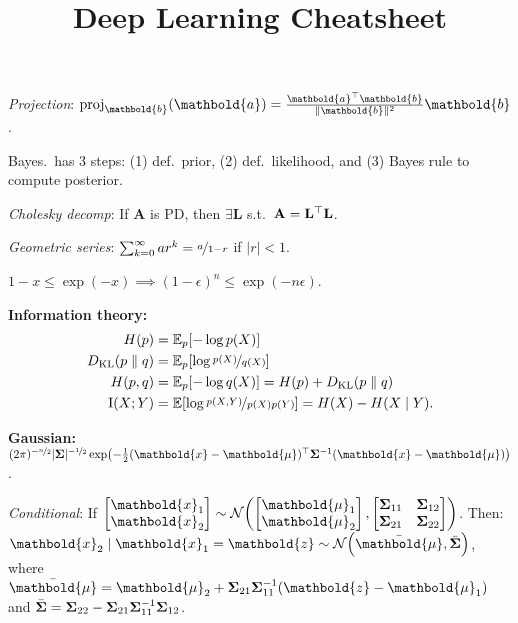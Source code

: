 \documentclass[9pt]{extarticle}
\title{Deep Learning Cheatsheet}
\newenvironment{subtopic}[1]
{\textbf{\sffamily #1:}}
{}
\renewcommand{\det}[1]{|#1|}
\renewcommand{\mat}[1]{\ensuremath{\mathbf{#1}}}
\renewcommand{\vec}[1]{\ensuremath{\mathbold{#1}}}
\begin{document}
\setlength{\columnsep}{0.1cm}

\begin{multicols*}{3}

    \textit{Projection}: $\mathrm{proj}_{\vec{b}} (\vec{a}) = \frac{\transpose{\vec{a}} \vec{b}}{\| \vec{b}
            \|^2} \vec{b}$.

    Bayes.\ has 3 steps: (1) def.\ prior, (2) def.\ likelihood, and (3) Bayes rule to compute
    posterior.

    \textit{Cholesky decomp}: If $\mat{A}$ is PD, then $\exists \mat{L}$ s.t.\ $\mat{A} = \transpose{\mat{L}} \mat{L}$.

    \textit{Geometric series}: $\sum_{k=0}^{\infty} ar^k = \nicefrac{a}{1-r}$ if $|r| < 1$.

    $1-x \leq \exp(-x) \implies (1-\epsilon)^n \leq \exp(-n \epsilon)$.

    \begin{subtopic}{Information theory}
        {\footnotesize\begin{align*}
                H(p)                        & = \E_p[-\log p(X)]                                                       \\
                D_{\mathrm{KL}}(p \;\|\; q) & = \E_p \lft[ \log \nicefrac{p(X)}{q(X)} \rgt]                            \\
                H(p,q)                      & = \E_p[-\log q(X)] = H(p) + D_{\mathrm{KL}}(p \;\|\; q)                  \\
                \mathrm{I}(X; Y)            & = \E \lft[ \log \nicefrac{p(X, Y)}{p(X) p(Y)} \rgt] = H(X) - H(X\mid Y).
            \end{align*}}

    \end{subtopic}

    \begin{subtopic}{Gaussian} \\
        $(2\pi)^{-\nicefrac{n}{2}} \det{\mat{\Sigma}}^{-\nicefrac{1}{2}} \exp \lft( -\frac{1}{2}\transpose{(\vec{x} - \vec{\mu})} \inv{\mat{\Sigma}}(\vec{x} - \vec{\mu}) \rgt)$.

        \textit{Conditional}: If $\begin{bmatrix} \vec{x}_1 \\ \vec{x}_2 \end{bmatrix} \sim \mathcal{N}\lft( \begin{bmatrix} \vec{\mu}_1 \\ \vec{\mu}_2 \end{bmatrix}, \begin{bmatrix} \mat{\Sigma}_{11} & \mat{\Sigma}_{12} \\ \mat{\Sigma}_{21} & \mat{\Sigma}_{22} \end{bmatrix} \rgt)$.
        Then: $\vec{x}_2 \mid \vec{x}_1 = \vec{z} \sim \mathcal{N}\lft( \bar{\vec{\mu}}, \bar{\mat{\Sigma}}
            \rgt)$, where $\bar{\vec{\mu}} = \vec{\mu}_2 + \mat{\Sigma}_{21} \inv{\mat{\Sigma}_{11}}
            (\vec{z} - \vec{\mu}_1)$ and $\bar{\mat{\Sigma}} = \mat{\Sigma}_{22} - \mat{\Sigma}_{21}
            \inv{\mat{\Sigma}_{11}} \mat{\Sigma}_{12}$.


\end{subtopic}
\end{multicols*}
\end{document}
